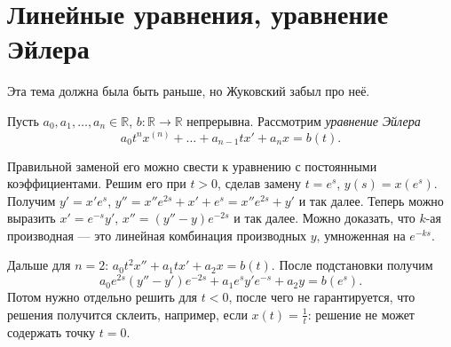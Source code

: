 \section{Линейные уравнения, уравнение Эйлера}
Эта тема должна была быть раньше, но Жуковский забыл про неё.

Пусть $a_0, a_1, \dots, a_n \in \mathbb R$, $b: \mathbb R \to \mathbb R$ непрерывна.
Рассмотрим \textit{уравнение Эйлера}
\[
    a_0t^n x^{(n)} + \dots + a_{n-1}t x' + a_nx = b(t).
\]

Правильной заменой его можно свести к уравнению с постоянными коэффициентами.
Решим его при $t > 0$, сделав замену $t = e^s$, $y(s) = x(e^s)$.
Получим $y' = x' e^s$, $y'' = x'' e^{2s} + x' + e^s = x'' e^{2s} + y'$ и так далее.
Теперь можно выразить $x' = e^{-s} y'$, $x'' = (y'' - y)e^{-2s}$ и так далее.
Можно доказать, что $k$-ая производная --- это линейная комбинация производных $y$, умноженная на $e^{-ks}$.

Дальше для $n = 2$: $a_0t^2 x'' + a_1 t x' + a_2 x = b(t)$.
После подстановки получим
\[
    a_0 e^{2s}(y'' - y') e^{-2s} + a_1 e^s y' e^{-s} + a_2y = b(e^s).
\]
Потом нужно отдельно решить для $t < 0$, после чего не гарантируется, что решения получится склеить, например, если $x(t) = \frac{1}{t}$: решение не может содержать точку $t = 0$.

